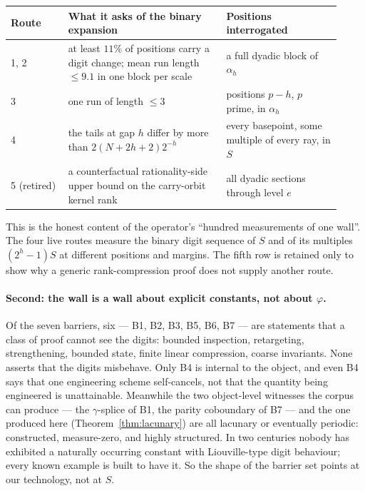 \begin{center}
\begin{tabular}{p{0.16\linewidth} p{0.44\linewidth} p{0.32\linewidth}}
\hline
Route & What it asks of the binary expansion & Positions interrogated \\
\hline
1, 2 & at least $11\%$ of positions carry a digit change; mean run length
$\le 9.1$ in one block per scale & a full dyadic block of $\alpha_h$ \\
3 & one run of length $\le 3$ & positions $p-h$, $p$ prime, in $\alpha_h$ \\
4 & the tails at gap $h$ differ by more than $2(N+2h+2)2^{-h}$ & every
basepoint, some multiple of every ray, in $S$ \\
5 (retired) & a counterfactual rationality-side upper bound on the carry-orbit kernel rank &
all dyadic sections through level $e$ \\
\hline
\end{tabular}
\end{center}

\noindent
This is the honest content of the operator's ``hundred measurements of one
wall''. The four live routes measure the binary digit sequence of $S$ and of
its multiples $(2^{h}-1)S$ at different positions and margins.  The fifth row
is retained only to show why a generic rank-compression proof does not supply
another route.

\paragraph{Second: the wall is a wall about explicit constants, not about
$\varphi$.}
Of the seven barriers, six --- B1, B2, B3, B5, B6, B7 --- are statements that
a class of proof cannot see the digits: bounded inspection, retargeting,
strengthening, bounded state, finite linear compression, coarse invariants.
None asserts that the digits misbehave. Only B4 is internal to the object,
and even B4 says that one engineering scheme self-cancels, not that the
quantity being engineered is unattainable. Meanwhile the two object-level
witnesses the corpus can produce --- the $\gamma$-splice of B1, the parity
coboundary of B7 --- and the one produced here
(Theorem~\ref{thm:lacunary}) are all lacunary or eventually periodic:
constructed, measure-zero, and highly structured. In two centuries nobody has
exhibited a naturally occurring constant with Liouville-type digit behaviour;
every known example is built to have it. So the shape of the barrier set
points at our technology, not at $S$.

